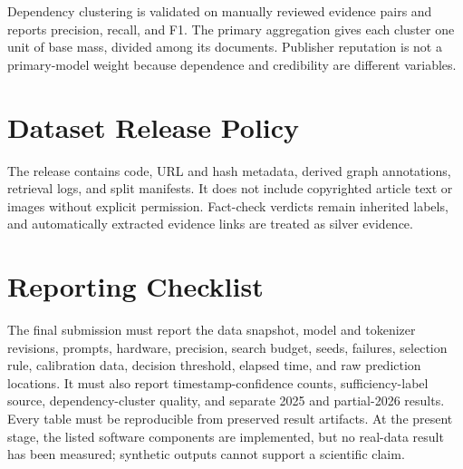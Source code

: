 \documentclass[11pt]{article}
\begin{document}
Dependency clustering is validated on manually reviewed evidence pairs and reports precision, recall, and F1. The primary aggregation gives each cluster one unit of base mass, divided among its documents. Publisher reputation is not a primary-model weight because dependence and credibility are different variables.

\section{Dataset Release Policy}
The release contains code, URL and hash metadata, derived graph annotations, retrieval logs, and split manifests. It does not include copyrighted article text or images without explicit permission. Fact-check verdicts remain inherited labels, and automatically extracted evidence links are treated as silver evidence.

\section{Reporting Checklist}
The final submission must report the data snapshot, model and tokenizer revisions, prompts, hardware, precision, search budget, seeds, failures, selection rule, calibration data, decision threshold, elapsed time, and raw prediction locations. It must also report timestamp-confidence counts, sufficiency-label source, dependency-cluster quality, and separate 2025 and partial-2026 results. Every table must be reproducible from preserved result artifacts. At the present stage, the listed software components are implemented, but no real-data result has been measured; synthetic outputs cannot support a scientific claim.
\end{document}
